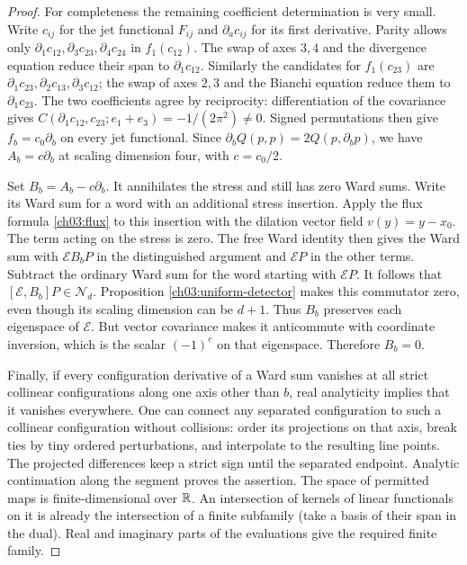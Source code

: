 \begin{proof}
For completeness the remaining coefficient determination is very small.
Write $c_{ij}$ for the jet functional $F_{ij}$ and $\partial_a c_{ij}$ for its
first derivative. Parity allows only
$\partial_1c_{12},\partial_3c_{23},\partial_4c_{24}$ in $f_1(c_{12})$.
The swap of axes $3,4$ and the divergence equation reduce their span to
$\partial_1c_{12}$. Similarly the candidates for $f_1(c_{23})$ are
$\partial_1c_{23},\partial_2c_{13},\partial_3c_{12}$;
the swap of axes $2,3$ and the Bianchi equation reduce them to
$\partial_1c_{23}$. The two coefficients agree by reciprocity:
differentiation of the covariance gives
$C(\partial_1c_{12},c_{23};e_1+e_3)=-1/(2\pi^2)\ne0$.
Signed permutations then give $f_b=c_0\partial_b$ on every jet functional.
Since $\partial_bQ(p,p)=2Q(p,\partial_bp)$, we have
$A_b=c\partial_b$ at scaling dimension four, with $c=c_0/2$.

Set $B_b=A_b-c\partial_b$. It annihilates the stress and still has zero
Ward sums. Write its Ward sum for a word with an additional stress
insertion. Apply the flux formula \eqref{ch03:flux} to this insertion
with the dilation vector field $v(y)=y-x_0$. The term acting on the stress is zero. The free Ward identity
then gives the Ward sum with $\mathscr E B_bP$ in the distinguished argument
and $\mathscr EP$ in the other terms. Subtract the ordinary Ward sum
for the word starting with $\mathscr EP$. It follows that
$[\mathscr E,B_b]P\in\mathcal N_d$. Proposition
\ref{ch03:uniform-detector} makes this commutator zero, even though its
scaling dimension can be $d+1$. Thus $B_b$ preserves each eigenspace of $\mathscr E$.
But vector covariance makes it anticommute with coordinate inversion,
which is the scalar $(-1)^e$ on that eigenspace. Therefore $B_b=0$.

Finally, if every configuration derivative of a Ward sum vanishes at
all strict collinear configurations along one axis other than $b$,
real analyticity implies that it vanishes everywhere. One can connect
any separated configuration to such a collinear configuration without
collisions: order its projections on that axis, break ties by tiny
ordered perturbations, and interpolate to the resulting line points.
The projected differences keep a strict sign until the separated endpoint.
Analytic continuation along the segment proves the assertion.
The space of permitted maps is finite-dimensional over $\mathbb R$.
An intersection of kernels of linear functionals on it is already the
intersection of a finite subfamily (take a basis of their span in the
dual). Real and imaginary parts of the evaluations give the required
finite family.
\end{proof}

